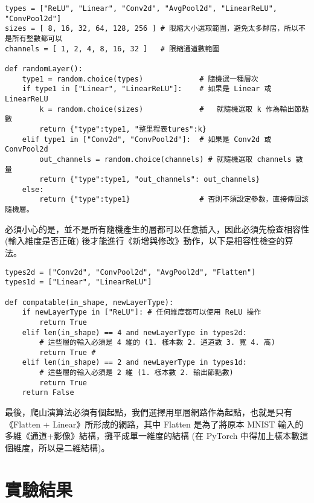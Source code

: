 \documentclass{article}
\begin{document}
\begin{minipage}{\linewidth}
\begin{lstlisting}
types = ["ReLU", "Linear", "Conv2d", "AvgPool2d", "LinearReLU", "ConvPool2d"]
sizes = [ 8, 16, 32, 64, 128, 256 ] # 限縮大小選取範圍，避免太多鄰居，所以不是所有整數都可以
channels = [ 1, 2, 4, 8, 16, 32 ]   # 限縮通道數範圍

def randomLayer():
    type1 = random.choice(types)             # 隨機選一種層次
    if type1 in ["Linear", "LinearReLU"]:    # 如果是 Linear 或 LinearReLU
        k = random.choice(sizes)             #   就隨機選取 k 作為輸出節點數
        return {"type":type1, "整里程表tures":k}
    elif type1 in ["Conv2d", "ConvPool2d"]:  # 如果是 Conv2d 或 ConvPool2d
        out_channels = random.choice(channels) # 就隨機選取 channels 數量
        return {"type":type1, "out_channels": out_channels}
    else:                                    
        return {"type":type1}                # 否則不須設定參數，直接傳回該隨機層。
\end{lstlisting}
\end{minipage}

必須小心的是，並不是所有隨機產生的層都可以任意插入，因此必須先檢查相容性 (輸入維度是否正確) 後才能進行《新增與修改》動作，以下是相容性檢查的算法。

\begin{minipage}{\linewidth}
\begin{lstlisting}
types2d = ["Conv2d", "ConvPool2d", "AvgPool2d", "Flatten"]
types1d = ["Linear", "LinearReLU"]

def compatable(in_shape, newLayerType):
    if newLayerType in ["ReLU"]: # 任何維度都可以使用 ReLU 操作
        return True
    elif len(in_shape) == 4 and newLayerType in types2d:
        # 這些層的輸入必須是 4 維的 (1. 樣本數 2. 通道數 3. 寬 4. 高)
        return True # 
    elif len(in_shape) == 2 and newLayerType in types1d:
        # 這些層的輸入必須是 2 維 (1. 樣本數 2. 輸出節點數)
        return True
    return False
\end{lstlisting}
\end{minipage}

最後，爬山演算法必須有個起點，我們選擇用單層網路作為起點，也就是只有《Flatten + Linear》所形成的網路，其中 Flatten 是為了將原本 MNIST 輸入的多維《通道+影像》結構，攤平成單一維度的結構 (在 PyTorch 中得加上樣本數這個維度，所以是二維結構)。


\section{實驗結果}
\end{document}
